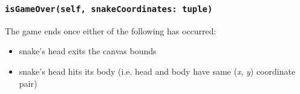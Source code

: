\documentclass{article}
\begin{document}
\subsubsection{\texttt{isGameOver(self, snakeCoordinates: tuple)}}\label{sec:Game_Over}
The game ends once either of the following has occurred:
\begin{itemize}
    \item snake's head exits the canvas bounds
    \item snake's head hits its body (i.e. head and body have same (\textit{x}, \textit{y}) coordinate pair)
\end{itemize}
\end{document}
